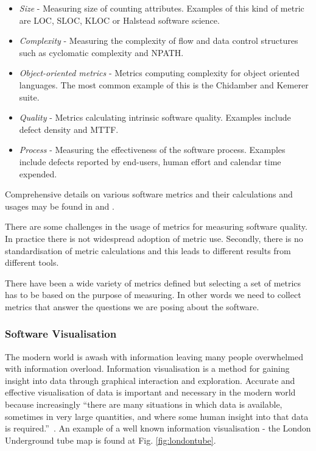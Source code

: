 \begin{itemize}
	\item \textit{Size} - Measuring size of counting attributes. Examples of this kind of metric are LOC, SLOC, KLOC or Halstead software science.
	\item \textit{Complexity} - Measuring the complexity of flow and data control structures such as cyclomatic complexity and NPATH.
	\item \textit{Object-oriented metrics} - Metrics computing complexity for object oriented languages. The most common example of this is the Chidamber and Kemerer suite.
	\item \textit{Quality} - Metrics calculating intrinsic software quality. Examples include defect density and MTTF.
	\item \textit{Process} - Measuring the effectiveness of the software process. Examples include defects reported by end-users, human effort and calendar time expended.
\end{itemize}

Comprehensive details on various software metrics and their calculations and usages may be found in \citet{fenton98} and \citet{hendersonsellers95}.

There are some challenges in the usage of metrics for measuring software quality. In practice there is not widespread adoption of metric use. Secondly, there is no standardisation of metric calculations and this leads to different results from different tools.

There have been a wide variety of metrics defined but selecting a set of metrics has to be based on the purpose of measuring. In other words we need to collect metrics that answer the questions we are posing about the software.

\subsubsection{Software Visualisation}

The modern world is awash with information leaving many people overwhelmed with information overload.  Information visualisation is a method for gaining insight into data through graphical interaction and exploration. Accurate and effective visualisation of data is important and necessary in the modern world because increasingly ``there are many situations in which data is available, sometimes in very large quantities, and where some human insight into that data is required.''~\citep{spence07}. An example of a well known information visualisation - the London Underground tube map is found at Fig. \ref{fig:londontube}.

